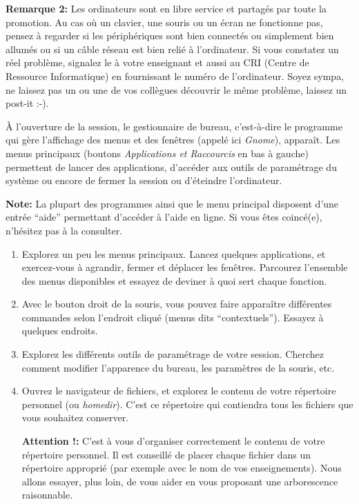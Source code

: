 \documentclass{article}
\begin{document}
\begin{exercice}
\textbf{Remarque 2: }Les ordinateurs sont en libre service et partagés par toute la promotion. Au cas où un clavier, une souris ou un écran ne fonctionne pas, pensez à regarder si les périphériques sont bien connectés ou simplement bien allumés ou si un câble réseau est bien relié à l'ordinateur. 
Si vous constatez un réel problème, signalez le à votre enseignant et aussi au CRI (Centre de Ressource Informatique) en fournissant le numéro de l'ordinateur. Soyez sympa, ne laissez pas un ou une de vos collègues découvrir le même problème, laissez un post-it :-).

\end{exercice}

\begin{exercice}

À l'ouverture de la session, le gestionnaire de bureau, c'est-à-dire le
programme qui gère l'affichage des menus et des fenêtres (appelé ici \emph{Gnome}),  
apparaît. Les menus principaux (boutons \emph{Applications et Raccourcis} en bas à gauche)
permettent de lancer des applications, d'accéder aux outils de paramétrage du
système ou encore de fermer la session ou d'éteindre l'ordinateur.

\medskip

\textbf{Note: }La plupart des programmes ainsi que le menu principal disposent
d'une entrée ``aide'' permettant d'accéder à l'aide en ligne. Si vous êtes
coincé(e), n'hésitez pas à la consulter.

\begin{enumerate}

\item
  Explorez un peu les menus principaux. Lancez quelques applications, et
  exercez-vous à agrandir, fermer et déplacer les fenêtres. Parcourez
  l'ensemble des menus disponibles et essayez de deviner à quoi sert
  chaque fonction.
\item
  Avec le bouton droit de la souris, vous pouvez faire apparaître
  différentes commandes selon l'endroit cliqué (menus dits ``contextuels''). Essayez à quelques endroits.
\item
  Explorez les différents outils de paramétrage de votre session.
  Cherchez comment modifier l'apparence du bureau, les paramètres de la
  souris, etc.
\item
  Ouvrez le navigateur de fichiers, et explorez le contenu de votre
  répertoire personnel (ou \emph{homedir}). C'est ce répertoire qui
  contiendra tous les fichiers que vous souhaitez conserver.

  \textbf{Attention !: }C'est à vous d'organiser correctement le contenu de votre
    répertoire personnel. Il est conseillé de placer chaque fichier dans un
    répertoire approprié (par exemple avec le nom de vos enseignements). 
    Nous allons essayer, plus loin, de vous aider en vous proposant une arborescence raisonnable.

\medskip

\end{enumerate}

\end{exercice}
\end{document}
